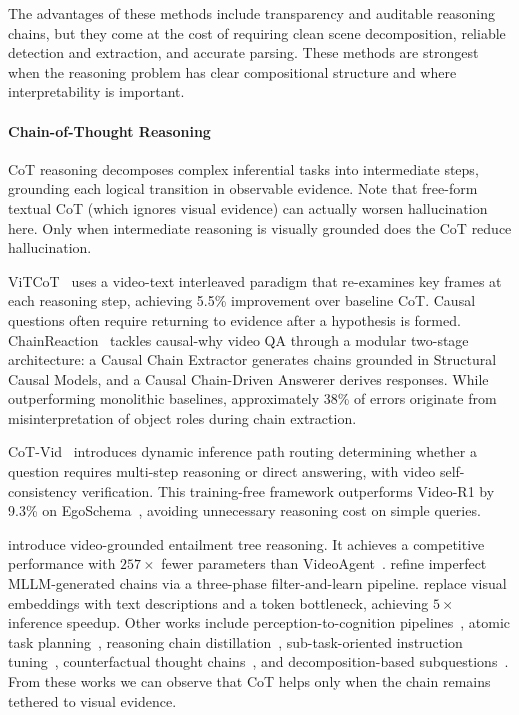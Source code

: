 \documentclass[10pt]{article} %
\begin{document}
The advantages of these methods include transparency and auditable reasoning chains, but they come at the cost of requiring clean scene decomposition, reliable detection and extraction, and accurate parsing. These methods are strongest when the reasoning problem has clear compositional structure and where interpretability is important.

\paragraph{Chain-of-Thought Reasoning}

CoT reasoning decomposes complex inferential tasks into intermediate steps, grounding each logical transition in observable evidence. 
Note that free-form textual CoT (which ignores visual evidence) can actually worsen hallucination here. Only when intermediate reasoning is visually grounded does the CoT reduce hallucination.

ViTCoT~\citep{Zhang2025ViTCoTVI} uses a video-text interleaved paradigm that re-examines key frames at each reasoning step, achieving 5.5\% improvement over baseline CoT. Causal questions often require returning to evidence after a hypothesis is formed. ChainReaction~\citep{Parmar2025ChainReactionCC} tackles causal-why video QA through a modular two-stage architecture: a Causal Chain Extractor generates chains grounded in Structural Causal Models, and a Causal Chain-Driven Answerer derives responses. While outperforming monolithic baselines, approximately 38\% of errors originate from misinterpretation of object roles during chain extraction.

CoT-Vid~\citep{Jin2025VISTAMS} introduces dynamic inference path routing determining whether a question requires multi-step reasoning or direct answering, with video self-consistency verification. This training-free framework outperforms Video-R1 by 9.3\% on EgoSchema~\citep{mangalam2023egoschema}, avoiding unnecessary reasoning cost on simple queries.

\citet{Liu2025CommonsenseVQ} introduce video-grounded entailment tree reasoning. It achieves a competitive performance with $257\times$ fewer parameters than VideoAgent~\citep{Wang2024VideoAgentLV}. \citet{Liang2025ReasVQAAV} refine imperfect MLLM-generated chains via a three-phase filter-and-learn pipeline. \citet{Wang2023VamosVA} replace visual embeddings with text descriptions and a token bottleneck, achieving $5\times$ inference speedup. Other works include perception-to-cognition pipelines~\citep{Fei2024VideoofThoughtSV}, atomic task planning~\citep{Chen2025VQAGuiderGM}, reasoning chain distillation~\citep{Shi2024EnhancingVR}, sub-task-oriented instruction tuning~\citep{Wang2025CoTasksCB}, counterfactual thought chains~\citep{Zhang2025CanVL}, and decomposition-based subquestions~\citep{Kamoto2025DIVEDI}.
From these works we can observe that CoT helps only when the chain remains tethered to visual evidence. %
\end{document}
